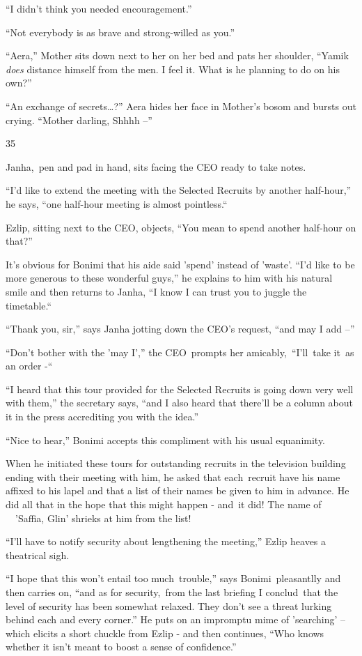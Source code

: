\documentclass[twoside,11pt]{book}
\begin{document}
``I didn't think you needed encouragement.'' \ 

``Not everybody is as brave and strong-willed as you.''

``Aera,'' Mother sits down next to her on her bed and pats her shoulder, ``Yamik
\textit{does} distance himself from the men. I feel it. What is he planning to do on his own?'' 

``An exchange of secrets{\dots}?'' Aera hides her face in Mother's bosom and bursts out
crying. ``Mother darling, Shhhh --'' 


\bigskip

35\ 

Janha,~pen and pad in hand, sits facing the CEO ready to take notes.\ 

``I'd like to extend the meeting with the Selected Recruits by another half-hour,'' he says,
``one half-hour meeting is almost pointless.``{\ }

Ezlip, sitting next to the CEO, objects, ``You mean to spend another half{}-hour on that?''

It's obvious for Bonimi that his aide said 'spend' instead of {}'waste'. ``I'd like to be more generous to
these wonderful guys,'' he explains to him with his natural smile and then returns to Janha,
``I know I can trust you to juggle the timetable.``\ 

``Thank you, sir,'' says Janha jotting down the CEO's request, ``and may I add --'' 

``Don't bother with the 'may I','' the CEO\ prompts her amicably,\ ``I{}'ll\ take
it{\ }as an order -``\ 

``I heard that this tour provided for the Selected Recruits is going down very well with
them,'' the secretary says, ``and I also heard that there'll be a column about it in the
press accrediting you with the idea.''

``Nice to hear,'' Bonimi accepts this compliment with his usual equanimity. 

When he initiated these tours for outstanding recruits in the television building ending with their meeting with him, he
asked that each\ recruit have his name affixed to his lapel and that a list of their names be given to him in advance.
He did all that in the hope that this might  happen - and{\ }it did! The name
of ~~{}'Saffia, Glin' shrieks at him from the list!\ 

``I'll have to notify security about lengthening the meeting,'' Ezlip heaves a theatrical
sigh. 

``I hope that this won't entail too much~trouble,'' says Bonimi\ pleasantlly and then carries
on, ``and as for security,\ from the last briefing I conclud\textit{\ }that the level of security has been
somewhat relaxed. They don't see a threat lurking behind each and every corner.'' He puts on an impromptu
mime of {}'searching{}' -- which elicits a short chuckle from Ezlip - and then continues, ``Who knows
whether it isn't meant to boost a sense of confidence.'' 
\end{document}
